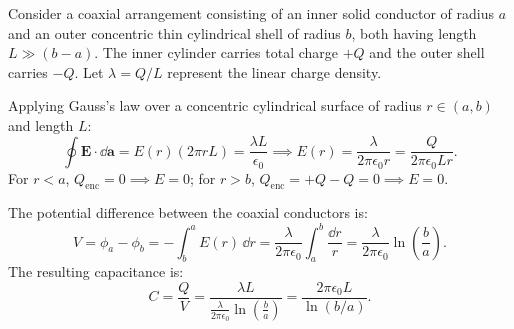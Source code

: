 \begin{example}
    Consider a coaxial arrangement consisting of an inner solid conductor of radius \(a\) and an outer concentric thin cylindrical shell of radius \(b\), both having length \(L \gg (b - a)\). The inner cylinder carries total charge \(+Q\) and the outer shell carries \(-Q\). Let \(\lambda = Q/L\) represent the linear charge density.
    
    Applying Gauss's law over a concentric cylindrical surface of radius \(r \in (a, b)\) and length \(L\):
    \begin{equation}
        \oint \bm{E}\cdot\dd\bm{a} = E(r)(2\pi r L) = \frac{\lambda L}{\epsilon_0} \implies E(r) = \frac{\lambda}{2\pi\epsilon_0 r} = \frac{Q}{2\pi\epsilon_0 L r}.
    \end{equation}
    For \(r < a\), \(Q_{\text{enc}} = 0 \implies E = 0\); for \(r > b\), \(Q_{\text{enc}} = +Q - Q = 0 \implies E = 0\).
    
    The potential difference between the coaxial conductors is:
    \begin{equation}
        V = \phi_a - \phi_b = -\int_b^a E(r)\,\dd r = \frac{\lambda}{2\pi\epsilon_0} \int_a^b \frac{\dd r}{r} = \frac{\lambda}{2\pi\epsilon_0}\ln\left(\frac{b}{a}\right).
    \end{equation}
    The resulting capacitance is:
    \begin{equation}
        C = \frac{Q}{V} = \frac{\lambda L}{\frac{\lambda}{2\pi\epsilon_0}\ln\left(\frac{b}{a}\right)} = \frac{2\pi\epsilon_0 L}{\ln(b/a)}.
    \end{equation}
\end{example}

